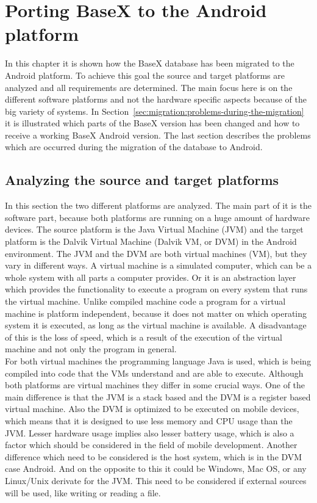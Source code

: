 \chapter{Porting BaseX to the Android platform}
\label{sec:migration:porting-basex-to-android}
In this chapter it is shown how the BaseX database has been migrated to the Android platform.
To achieve this goal the source and target platforms are analyzed and all requirements are determined.
The main focus here is on the different software platforms and not the hardware specific aspects because of the big variety of systems. 
In Section~\ref{sec:migration:problems-during-the-migration} it is illustrated which parts of the BaseX version has been changed and how to receive a working BaseX Android version.
The last section describes the problems which are occurred during the migration of the database to Android.


\section{Analyzing the source and target platforms} 
\label{sec:migration:analysing-the-source-and-target-platform}
In this section the two different platforms are analyzed.
The main part of it is the software part, because both platforms are running on a huge amount of hardware devices.
The source platform is the Java Virtual Machine (JVM) and the target platform is the Dalvik Virtual Machine (Dalvik VM, or DVM) in the Android environment.
The JVM and the DVM are both virtual machines (VM), but they vary in different ways.
A virtual machine is a simulated computer, which can be a whole system with all parts a computer provides.
Or it is an abstraction layer which provides the functionality to execute a program on every system that runs the virtual machine.
Unlike compiled machine code a program for a virtual machine is platform independent, because it does not matter on which operating system it is executed, as long as the virtual machine is available.
A disadvantage of this is the loss of speed, which is a result of the execution of the virtual machine and not only the program in general.~\cite{craig2006virtual}
\\
For both virtual machines the programming language Java is used, which is being compiled into code that the VMs understand and are able to execute.
Although both platforms are virtual machines they differ in some crucial ways.
One of the main difference is that the JVM is a stack based and the DVM is a register based virtual machine.
Also the DVM is optimized to be executed on mobile devices, which means that it is designed to use less memory and CPU usage than the JVM.
Lesser hardware usage implies also lesser battery usage, which is also a factor which should be considered in the field of mobile development.
Another difference which need to be considered is the host system, which is in the DVM case Android.
And on the opposite to this it could be Windows, Mac OS, or any Linux/Unix derivate for the JVM. 
This need to be considered if external sources will be used, like writing or reading a file.


